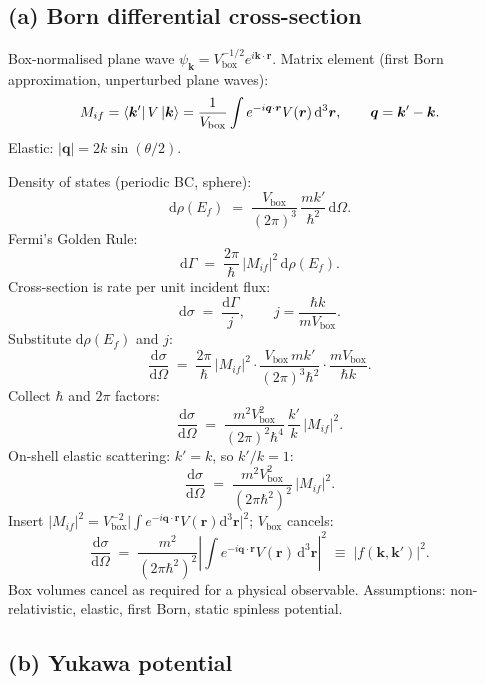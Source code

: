 \documentclass[11pt]{article}
\newcommand{\de}{\mathrm{d}}
\begin{document}
\subsection*{(a) Born differential cross-section}

Box-normalised plane wave $\psi_{\bm k}=V_\text{box}^{-1/2}e^{i\bm k\cdot\bm r}$. Matrix element (first Born approximation, unperturbed plane waves):
\begin{equation}
M_{if}=\bra{\bm k'}V\ket{\bm k}=\frac{1}{V_\text{box}}\int e^{-i\bm q\cdot\bm r}V(\bm r)\,\de^{3}\bm r,\qquad\bm q=\bm k'-\bm k.
\label{eq:Mif}
\end{equation}
Elastic: $|\bm q|=2k\sin(\theta/2)$.

Density of states (periodic BC, sphere):
\[
\de\rho(E_f)\;=\;\frac{V_\text{box}}{(2\pi)^{3}}\,\frac{mk'}{\hbar^{2}}\,\de\Omega.
\]
Fermi's Golden Rule:
\[
\de\Gamma\;=\;\frac{2\pi}{\hbar}\,|M_{if}|^{2}\,\de\rho(E_f).
\]
Cross-section is rate per unit incident flux:
\[
\de\sigma\;=\;\frac{\de\Gamma}{j},\qquad j=\frac{\hbar k}{mV_\text{box}}.
\]
Substitute $\de\rho(E_f)$ and $j$:
\[
\frac{\de\sigma}{\de\Omega}\;=\;\frac{2\pi}{\hbar}\,|M_{if}|^{2}\cdot\frac{V_\text{box}\,m k'}{(2\pi)^{3}\hbar^{2}}\cdot\frac{m V_\text{box}}{\hbar k}.
\]
Collect $\hbar$ and $2\pi$ factors:
\[
\frac{\de\sigma}{\de\Omega}\;=\;\frac{m^{2}V_\text{box}^{2}}{(2\pi)^{2}\hbar^{4}}\,\frac{k'}{k}\,|M_{if}|^{2}.
\]
On-shell elastic scattering: $k'=k$, so $k'/k=1$:
\[
\frac{\de\sigma}{\de\Omega}\;=\;\frac{m^{2}V_\text{box}^{2}}{(2\pi\hbar^{2})^{2}}\,|M_{if}|^{2}.
\]
Insert $|M_{if}|^{2}=V_\text{box}^{-2}\bigl|\!\int e^{-i\bm q\cdot\bm r}V(\bm r)\de^{3}\bm r\bigr|^{2}$; $V_\text{box}$ cancels:
\begin{equation}
\boxed{\;\frac{\de\sigma}{\de\Omega}\;=\;\frac{m^{2}}{(2\pi\hbar^{2})^{2}}\left|\int e^{-i\bm q\cdot\bm r}V(\bm r)\,\de^{3}\bm r\right|^{2}\;\equiv\;|f(\bm k,\bm k')|^{2}.\;}
\label{eq:born-result}
\end{equation}
Box volumes cancel as required for a physical observable. Assumptions: non-relativistic, elastic, first Born, static spinless potential.

\subsection*{(b) Yukawa potential}
\end{document}
